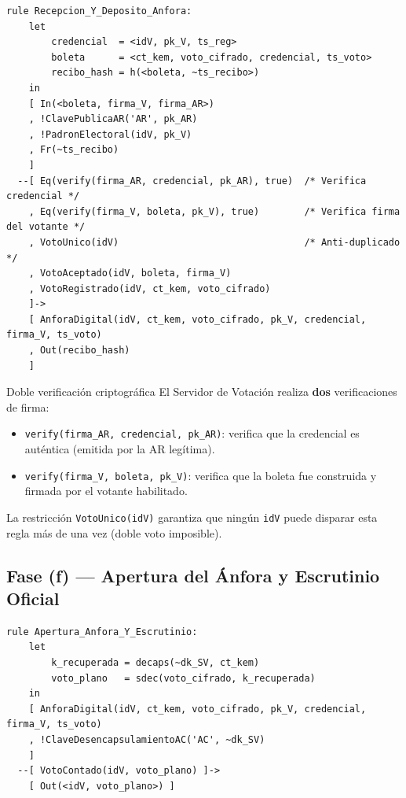\documentclass[12pt, a4paper]{article}
\begin{document}
\begin{lstlisting}[caption={Regla: El SV verifica la boleta y la deposita en el Ánfora.}]
rule Recepcion_Y_Deposito_Anfora:
    let
        credencial  = <idV, pk_V, ts_reg>
        boleta      = <ct_kem, voto_cifrado, credencial, ts_voto>
        recibo_hash = h(<boleta, ~ts_recibo>)
    in
    [ In(<boleta, firma_V, firma_AR>)
    , !ClavePublicaAR('AR', pk_AR)
    , !PadronElectoral(idV, pk_V)
    , Fr(~ts_recibo)
    ]
  --[ Eq(verify(firma_AR, credencial, pk_AR), true)  /* Verifica credencial */
    , Eq(verify(firma_V, boleta, pk_V), true)        /* Verifica firma del votante */
    , VotoUnico(idV)                                 /* Anti-duplicado */
    , VotoAceptado(idV, boleta, firma_V)
    , VotoRegistrado(idV, ct_kem, voto_cifrado)
    ]->
    [ AnforaDigital(idV, ct_kem, voto_cifrado, pk_V, credencial, firma_V, ts_voto)
    , Out(recibo_hash)
    ]
\end{lstlisting}

\begin{cajaConceto}{Doble verificación criptográfica}
El Servidor de Votación realiza \textbf{dos} verificaciones de firma:
\begin{itemize}
  \item \texttt{verify(firma\_AR, credencial, pk\_AR)}: verifica que la
        credencial es auténtica (emitida por la AR legítima).
  \item \texttt{verify(firma\_V, boleta, pk\_V)}: verifica que la boleta
        fue construida y firmada por el votante habilitado.
\end{itemize}
La restricción \texttt{VotoUnico(idV)} garantiza que ningún \texttt{idV}
puede disparar esta regla más de una vez (doble voto imposible).
\end{cajaConceto}

\subsection{Fase (f) — Apertura del Ánfora y Escrutinio Oficial}

\begin{lstlisting}[caption={Regla: La AC desencapsula y descifra cada voto.}]
rule Apertura_Anfora_Y_Escrutinio:
    let
        k_recuperada = decaps(~dk_SV, ct_kem)
        voto_plano   = sdec(voto_cifrado, k_recuperada)
    in
    [ AnforaDigital(idV, ct_kem, voto_cifrado, pk_V, credencial, firma_V, ts_voto)
    , !ClaveDesencapsulamientoAC('AC', ~dk_SV)
    ]
  --[ VotoContado(idV, voto_plano) ]->
    [ Out(<idV, voto_plano>) ]
\end{lstlisting}
\end{document}
